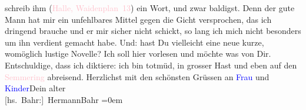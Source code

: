                schreib ihm (\textcolor{pink}{Halle, Waidenplan 13}{}\ledrightnote{\textcolor{pink}{Weidenplan}}) ein Wort, und
               zwar baldigst. Denn der gute Mann {\pb}hat mir ein
               unfehlbares Mittel gegen die Gicht versprochen, das ich dringend brauche und er mir
               sicher nicht schickt, so lang ich mich nicht besonders um ihn verdient gemacht habe.
               Und: hast Du vielleicht eine neue kurze, womöglich lustige Novelle? Ich soll hier
                  \label{K_L01897_1v}\label{K_L01897_1h} vorlesen und möchte was von Dir. Entschuldige, dass
               ich diktiere: ich bin totmüd, in grosser Hast und eben auf den \textcolor{pink}{Semmering}{}\ledrightnote{\textcolor{pink}{Semmering}} abreisend.\pend
           \pstart
           Herzlichst mit den schönsten Grüssen an \textcolor{blue}{Frau}{} und \textcolor{blue}{Kinder}{}Dein alter{\\[\baselineskip]}\spacefill\mbox{{[}hs. Bahr:{]} HermannBahr}\pend
           \leftskip=0em{}\endnumbering{}  
      